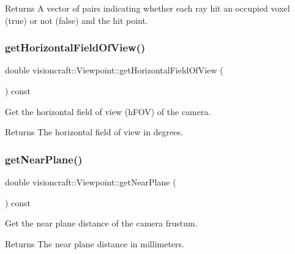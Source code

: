 \begin{DoxyReturn}{Returns}
A vector of pairs indicating whether each ray hit an occupied voxel (true) or not (false) and the hit point. 
\end{DoxyReturn}
\mbox{\label{classvisioncraft_1_1Viewpoint_aa59433b34ceeb80ec93ae23ba07ead02}} 
\subsubsection{\texorpdfstring{get\+Horizontal\+Field\+Of\+View()}{getHorizontalFieldOfView()}}
{\footnotesize\ttfamily double visioncraft\+::\+Viewpoint\+::get\+Horizontal\+Field\+Of\+View (\begin{DoxyParamCaption}{ }\end{DoxyParamCaption}) const}



Get the horizontal field of view (h\+F\+OV) of the camera. 

\begin{DoxyReturn}{Returns}
The horizontal field of view in degrees. 
\end{DoxyReturn}
\mbox{\label{classvisioncraft_1_1Viewpoint_ae33dd06cba85412548920a0dfe25a5cd}} 
\subsubsection{\texorpdfstring{get\+Near\+Plane()}{getNearPlane()}}
{\footnotesize\ttfamily double visioncraft\+::\+Viewpoint\+::get\+Near\+Plane (\begin{DoxyParamCaption}{ }\end{DoxyParamCaption}) const}



Get the near plane distance of the camera frustum. 

\begin{DoxyReturn}{Returns}
The near plane distance in millimeters. 
\end{DoxyReturn}
\mbox{\label{classvisioncraft_1_1Viewpoint_a893455a682229abfa11fcc8bba3af310}} 
